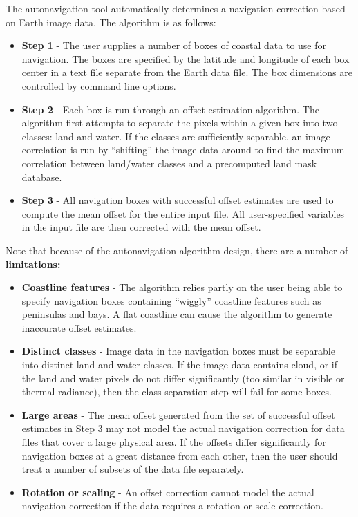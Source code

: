  The autonavigation tool automatically determines a navigation correction based on Earth image data. The algorithm is as follows:
\begin{itemize}
\item \textbf{Step 1}
 - The user supplies a number of boxes of coastal data to use for navigation. The boxes are specified by the latitude and longitude of each box center in a text file separate from the Earth data file. The box dimensions are controlled by command line options.
\item \textbf{Step 2}
 - Each box is run through an offset estimation algorithm. The algorithm first attempts to separate the pixels within a given box into two classes: land and water. If the classes are sufficiently separable, an image correlation is run by ``shifting'' the image data around to find the maximum correlation between land/water classes and a precomputed land mask database.
\item \textbf{Step 3}
 - All navigation boxes with successful offset estimates are used to compute the mean offset for the entire input file. All user-specified variables in the input file are then corrected with the mean offset.

\end{itemize}


 Note that because of the autonavigation algorithm design, there are a number of \textbf{limitations:}

\begin{itemize}
\item \textbf{Coastline features}
 - The algorithm relies partly on the user being able to specify navigation boxes containing ``wiggly'' coastline features such as peninsulas and bays. A flat coastline can cause the algorithm to generate inaccurate offset estimates.
\item \textbf{Distinct classes}
 - Image data in the navigation boxes must be separable into distinct land and water classes. If the image data contains cloud, or if the land and water pixels do not differ significantly (too similar in visible or thermal radiance), then the class separation step will fail for some boxes.
\item \textbf{Large areas}
 - The mean offset generated from the set of successful offset estimates in Step 3 may not model the actual navigation correction for data files that cover a large physical area. If the offsets differ significantly for navigation boxes at a great distance from each other, then the user should treat a number of subsets of the data file separately.
\item \textbf{Rotation or scaling}
 - An offset correction cannot model the actual navigation correction if the data requires a rotation or scale correction.

\end{itemize}


